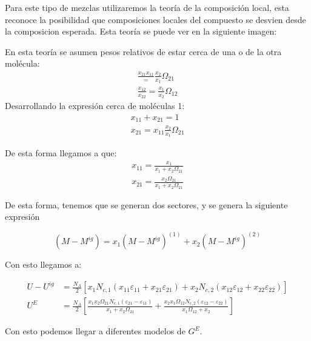 Para este tipo de mezclas utilizaremos la teoría de la composición local, esta reconoce la posibilidad que composiciones locales del compuesto se desvien desde la composicion esperada.
Esta teoría se puede ver en la siguiente imagen:


En esta teoría se asumen pesos relativos de estar cerca de una o de la otra molécula:
\begin{align}
    \frac{x_{21}{x_11}}=\frac{x_2}{x_1}\Omega_{21}\\
    \frac{x_{12}}{x_{22}}=\frac{x_1}{x_2}\Omega_{12}
\end{align}
Desarrollando la expresión cerca de moléculas 1:
\begin{align}
    x_{11}+x_{21}=1\\
    x_{21}=x_{11}\frac{x_{2}}{x_{1}}\Omega_{21}
\end{align}

De esta forma llegamos a que:
\begin{align}
    x_{11}=\frac{x_1}{x_1+x_2\Omega_{21}}\\
    x_{21}=\frac{x_2\Omega_{21}}{x_1+x_2\Omega_{21}}
\end{align}

De esta forma, tenemos que se generan dos sectores, y se genera la siguiente expresión

\begin{equation}
       (M-M^{ig})=x_1(M-M^{ig})^{(1)}+x_2(M-M^{ig})^{(2)}
\end{equation}

Con esto llegamos a:

\begin{align}
    U-U^{i g}&=\frac{N_{A}}{2}\left[x_{1} N_{c, 1}\left(x_{11} \varepsilon_{11}+x_{21} \varepsilon_{21}\right)+x_{2} N_{c, 2}\left(x_{12} \varepsilon_{12}+x_{22} \varepsilon_{22}\right)\right] \\
U^{E}&=\frac{N_{A}}{2}\left[\frac{x_{1} x_{2} \Omega_{21} N_{c, 1}\left(\varepsilon_{21}-\varepsilon_{11}\right)}{x_{1}+x_{2} \Omega_{21}}+\frac{x_{2} x_{1} \Omega_{12} N_{c, 2}\left(\varepsilon_{12}-\varepsilon_{22}\right)}{x_{1} \Omega_{12}+x_{2}}\right]
\end{align}

Con esto podemos llegar a diferentes modelos de $G^{E}$.


